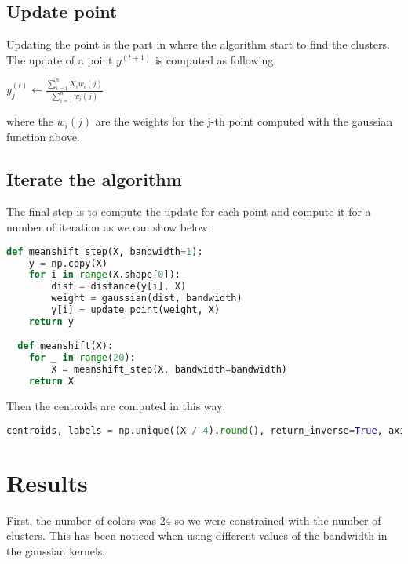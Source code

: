 \documentclass{ETHExercise}
\begin{document}
\subsection{Update point}
Updating the point is the part in where the algorithm start to find the clusters.
The update of a point $y^{(t+1)}$ is computed as following.

\begin{center}
  $y_j^{(t)} \leftarrow \frac{\sum\limits_{i=1}^{n}X_i w_i(j)}{\sum\limits_{i=1}^{n}w_i(j)}$
\end{center}

where the $w_i(j)$ are the weights for the j-th point computed with the gaussian function above.

\subsection{Iterate the algorithm}

The final step is to compute the update for each point and compute it for a number of iteration 
as we can show below:

\begin{lstlisting}[language=Python, caption=Mean-shift]
  def meanshift_step(X, bandwidth=1):
    y = np.copy(X)
    for i in range(X.shape[0]):
        dist = distance(y[i], X)
        weight = gaussian(dist, bandwidth)
        y[i] = update_point(weight, X)
    return y

  def meanshift(X):
    for _ in range(20):
        X = meanshift_step(X, bandwidth=bandwidth)
    return X
\end{lstlisting}

Then the centroids are computed in this way:
\begin{lstlisting}[language=Python, caption=Centroids]
  centroids, labels = np.unique((X / 4).round(), return_inverse=True, axis=0)
\end{lstlisting}

\section{Results}

First, the number of colors was 24 so we were constrained with the number of clusters.
This has been noticed when using different values of the bandwidth in the gaussian kernels.
\end{document}
